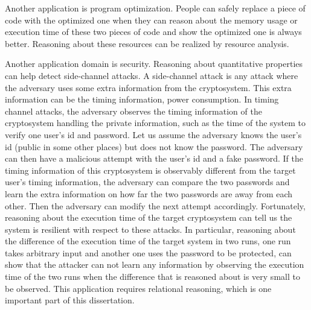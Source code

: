 {Another application is program optimization. 
People can safely replace a piece of code with the optimized one when they can reason about the memory usage or execution time of these two pieces of code and show the optimized one is always better. 
Reasoning about these resources can be realized by resource analysis.} 


Another application domain is security. { Reasoning about quantitative properties can help detect side-channel attacks.  
A side-channel attack is any attack where the adversary uses some extra information from the cryptosystem. 
This extra information can be the timing information, power consumption. 
In timing channel attacks, the adversary observes the timing information of the cryptosystem handling the private information, such as the time of the system to verify one user's id and password. 
Let us assume the adversary knows the user's id (public in some other places) but does not know the password. 
The adversary can then have a malicious attempt with the user's id and a fake password. 
If the timing information of this cryptosystem is observably different from the target user's timing information, the adversary can compare the two passwords and learn the extra information on how far the two passwords are away from each other. 
Then the adversary can modify the next attempt accordingly. 
Fortunately, reasoning about the execution time of the target cryptosystem can tell us the system is resilient with respect to these attacks. 
In particular, reasoning about the difference of the execution time of the target system in two runs, one run takes arbitrary input and another one uses the password to be protected, can show that the attacker can not learn any information by observing the execution time of the two runs when the difference that is reasoned about is very small to be observed. 
This application requires relational reasoning, which is one important part of this dissertation.}

